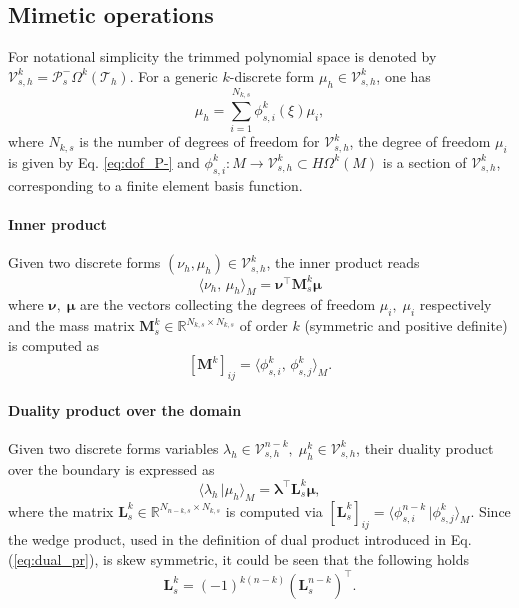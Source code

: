 \documentclass{elsarticle}
\newcommand{\inpr}[3][]{\ensuremath{\langle #2, \, #3 \rangle_{#1}}}
\newcommand{\dualpr}[3][]{\ensuremath{\langle #2 \, \vert #3 \rangle_{#1}}}
\begin{document}
\subsection{Mimetic operations}
For notational simplicity the trimmed polynomial space is denoted by $\mathcal{V}_{s, h}^k = \mathcal{P}^-_s\Omega^k(\mathcal{T}_h)$.
For a generic $k$-discrete form $\mu_{h} \in \mathcal{V}_{s, h}^k$, one has 
\begin{equation}\label{eq:trimmed_basis}
    \mu_{h} = \sum_{i=1}^{N_{k, s}} \phi_{s, i}^{k}(\xi) \mu_i, 
\end{equation}
where $N_{k, s}$ is the number of degrees of freedom for $\mathcal{V}_{s, h}^k$, the degree of freedom $\mu_i$ is given by Eq. \eqref{eq:dof_P-} and $\phi_{s, i}^{k} : M \rightarrow  \mathcal{V}_{s, h}^k \subset H\Omega^k(M)$ is a section of $\mathcal{V}_{s, h}^k$, corresponding to a finite element basis function.

\paragraph{Inner product}
Given two discrete forms $(\nu_h, \mu_h) \in \mathcal{V}_{s, h}^k$, the inner product reads
\begin{equation}\label{eq:alg_inner}
    \inpr[M]{\nu_h}{\mu_h} = \bm{\nu}^\top \mathbf{M}^k_s \bm{\mu}
\end{equation}
where $\bm{\nu}, \; \bm{\mu}$ are the vectors collecting the degrees of freedom $\mu_i, \; \mu_i$ respectively and the mass matrix $\mathbf{M}^k_s \in \mathbb{R}^{N_{k, s}\times N_{k, s}}$ of order $k$ (symmetric and positive definite) is computed as  
$$[\mathbf{M}^k]_{ij} = \inpr[M]{\phi_{s, i}^{k}}{\phi_{s, j}^{k}}.$$

\paragraph{Duality product over the domain}
Given two discrete forms variables $\lambda_h \in \mathcal{V}_{s, h}^{n-k}, \; \mu_h^k \in \mathcal{V}_{s, h}^{k}$, their duality product over the boundary is expressed as
\begin{equation}\label{eq:alg_dualpr}
    \dualpr[M]{\lambda_h}{\mu_h} = \bm{\lambda}^\top \mathbf{L}^k_s \bm{\mu},
\end{equation}
where the matrix $\mathbf{L}^k_s \in \mathbb{R}^{N_{n-k, s}\times N_{k, s}}$ is computed via $[\mathbf{L}^k_s]_{ij} = \dualpr[M]{\phi_{s, i}^{n-k}}{\phi_{s, j}^k}$. Since the wedge product, used in the definition of dual product introduced in Eq.(\ref{eq:dual_pr}), is skew symmetric, 
it  could be seen that the following holds
\begin{equation}
    \mathbf{L}^k_s = (-1)^{k(n-k)} (\mathbf{L}^{n-k}_s)^\top.
\end{equation}
\end{document}
